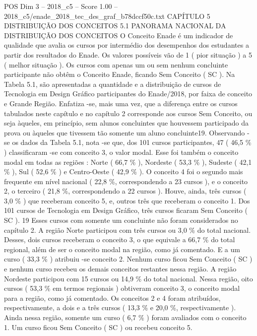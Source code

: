 \begin{textsample}{POS Dim 3 – 2018\_c5 – Score 1.00 – 2018\_c5/enade\_2018\_tec\_des\_graf\_b78dccf50c.txt}  \label{ex:f3_pos_185}
CAPÍTULO 5 DISTRIBUIÇÃO DOS CONCEITOS 5.1 PANORAMA NACIONAL DA DISTRIBUIÇÃO DOS CONCEITOS O Conceito Enade é um indicador de qualidade que avalia os cursos por intermédio dos desempenhos dos estudantes a partir dos resultados do Enade.
Os valores possíveis vão de 1 ( pior situação ) a 5 ( melhor situação ).
Os cursos com apenas um ou sem nenhum concluinte participante não obtêm o Conceito Enade, ficando Sem Conceito ( SC ).
Na Tabela 5.1, são apresentadas a quantidade e a distribuição de cursos de Tecnologia em Design Gráfico participantes do Enade/2018, por faixa de conceito e Grande Região.
Enfatiza -se, mais uma vez, que a diferença entre os cursos tabulados neste capítulo e no capítulo 2 corresponde aos cursos Sem Conceito, ou seja àqueles, em princípio, sem alunos concluintes que houvessem participado da prova ou àqueles que tivessem tão somente um aluno concluinte19.
Observando -se os dados da Tabela 5.1, nota -se que, dos 101 cursos participantes, 47 ( 46,5 \% ) classificaram -se com conceito 3, o valor modal.
Esse foi também o conceito modal em todas as regiões : Norte ( 66,7 \% ), Nordeste ( 53,3 \% ), Sudeste ( 42,1 \% ), Sul ( 52,6 \% ) e Centro-Oeste ( 42,9 \% ).
O conceito 4 foi o segundo mais frequente em nível nacional ( 22,8 \%, correspondendo a 23 cursos ), e o conceito 2, o terceiro ( 21,8 \%, correspondendo a 22 cursos ).
Houve, ainda, três cursos ( 3,0 \% ) que receberam conceito 5, e, outros três que receberam o conceito 1.
Dos 101 cursos de Tecnologia em Design Gráfico, três cursos ficaram Sem Conceito ( SC ). 19 Esses cursos com somente um concluinte não foram considerados no capítulo 2.
A região Norte participou com três cursos ou 3,0 \% do total nacional.
Desses, dois cursos receberam o conceito 3, o que equivale a 66,7 \% do total regional, além de ser o conceito modal na região, como já comentado.
E a um curso ( 33,3 \% ) atribuiu -se conceito 2.
Nenhum curso ficou Sem Conceito ( SC ) e nenhum curso recebeu os demais conceitos restantes nessa região.
A região Nordeste participou com 15 cursos ou 14,9 \% do total nacional.
Nessa região, oito cursos ( 53,3 \% em termos regionais ) obtiveram conceito 3, o conceito modal para a região, como já comentado.
Os conceitos 2 e 4 foram atribuídos, respectivamente, a dois e a três cursos ( 13,3 \% e 20,0 \%, respectivamente ).
Ainda nessa região, somente um curso ( 6,7 \% ) foram avaliados com o conceito 1.
Um curso ficou Sem Conceito ( SC ) ou recebeu conceito 5.

\end{textsample}
